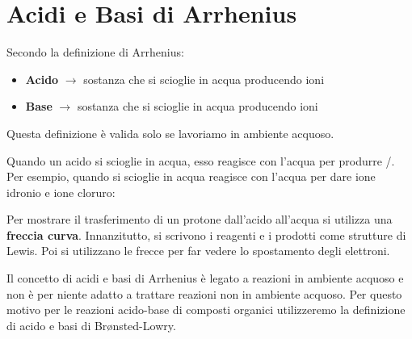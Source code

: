 \section{Acidi e Basi di Arrhenius}
\noindent Secondo la definizione di Arrhenius:
\begin{itemize}
	\item[] \textbf{Acido} \(\rightarrow\) sostanza che si scioglie in acqua producendo ioni 
	\item[] \textbf{Base} \(\rightarrow\) sostanza che si scioglie in acqua producendo ioni 
\end{itemize}
Questa definizione è valida solo se lavoriamo in ambiente acquoso.

Quando un acido si scioglie in acqua, esso reagisce con l'acqua per produrre /. Per esempio, quando  si scioglie in acqua reagisce con l'acqua per dare ione idronio e ione cloruro:


\begin{center}
\end{center}

Per mostrare il trasferimento di un protone dall'acido all'acqua si utilizza una \textbf{freccia curva}. Innanzitutto, si scrivono i reagenti e i prodotti come strutture di Lewis. Poi si utilizzano le frecce per far vedere lo spostamento degli elettroni.

\begin{reactions}
	\+ 
	\arrow 
	\+ 
\end{reactions}

Il concetto di acidi e basi di Arrhenius è legato a reazioni in ambiente acquoso e non è per niente adatto a trattare reazioni non in ambiente acquoso. Per questo motivo per le reazioni acido-base di composti organici utilizzeremo la definizione di acido e basi di Br{\o}nsted-Lowry.